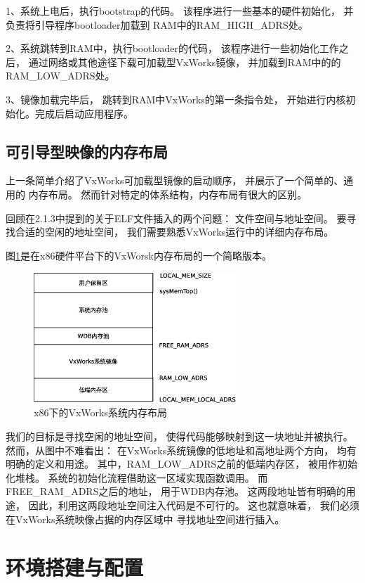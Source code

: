 1、系统上电后，执行bootstrap的代码。
该程序进行一些基本的硬件初始化，
并负责将引导程序bootloader加载到
RAM中的RAM\_HIGH\_ADRS处。

2、系统跳转到RAM中，执行bootloader的代码，
该程序进行一些初始化工作之后，
通过网络或其他途径下载可加载型VxWorks镜像，
并加载到RAM中的的RAM\_LOW\_ADRS处。

3、镜像加载完毕后，
跳转到RAM中VxWorks的第一条指令处，
开始进行内核初始化。完成后启动应用程序。


\subsection{可引导型映像的内存布局}

上一条简单介绍了VxWorks可加载型镜像的启动顺序，
并展示了一个简单的、通用的
内存布局。
然而针对特定的体系结构，内存布局有很大的区别。

回顾在2.1.3中提到的关于ELF文件插入的两个问题：
文件空间与地址空间。
要寻找合适的空闲的地址空间，
我们需要熟悉VxWorks运行中的详细内存布局。

图\ref{ram}是在x86硬件平台下的VxWorsk内存布局的一个简略版本。

\begin{figure}[h!]
    \centering
    \includegraphics[width=0.68\textwidth]{figure/ram.eps}
    \caption{x86下的VxWorks系统内存布局}
    \label{ram}
\end{figure}

我们的目标是寻找空闲的地址空间，
使得代码能够映射到这一块地址并被执行。
然而，从图中不难看出：
在VxWorks系统镜像的低地址和高地址两个方向，
均有明确的定义和用途。
其中，RAM\_LOW\_ADRS之前的低端内存区，
被用作初始化堆栈。
系统的初始化流程借助这一区域实现函数调用。
而FREE\_RAM\_ADRS之后的地址，
用于WDB内存池。
这两段地址皆有明确的用途，
因此，利用这两段地址空间注入代码是不可行的。
这也就意味着，
我们必须在VxWorks系统映像占据的内存区域中
寻找地址空间进行插入。


\section{环境搭建与配置}

